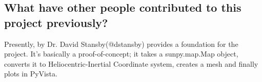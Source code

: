\subsection{What have other people contributed to this project previously?}
    Presently, \pr by Dr. David Stansby(@dstansby) provides a foundation for the project. It's basically a proof-of-concept; it takes a sunpy.map.Map object, converts it to Heliocentric-Inertial Coordinate system, creates a mesh and finally plots in PyVista.
    
